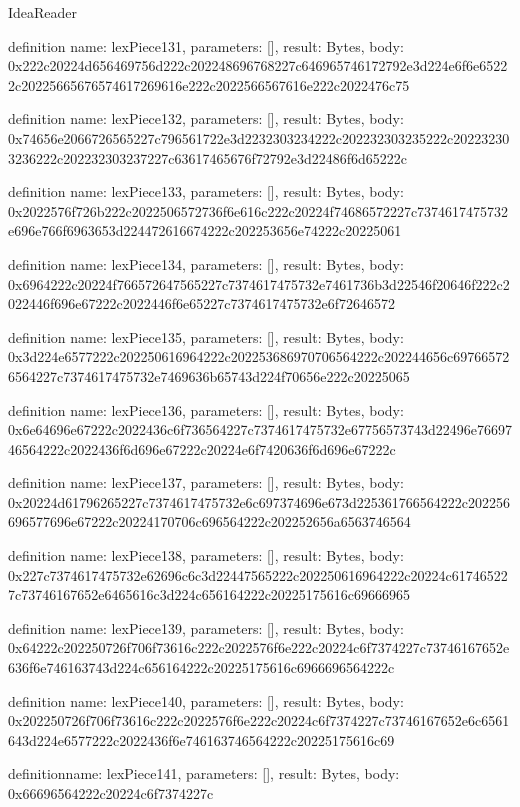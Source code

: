 \begin{lexlean}{IdeaReader}
\begin{semanticmodule}
definition{
  name: lexPiece131,
  parameters: [],
  result: Bytes,
  body: 0x222c20224d656469756d222c202248696768227c646965746172792e3d224e6f6e65222c20225665676574617269616e222c2022566567616e222c2022476c75
}

definition{
  name: lexPiece132,
  parameters: [],
  result: Bytes,
  body: 0x74656e2066726565227c796561722e3d2232303234222c202232303235222c202232303236222c202232303237227c63617465676f72792e3d22486f6d65222c
}

definition{
  name: lexPiece133,
  parameters: [],
  result: Bytes,
  body: 0x2022576f726b222c2022506572736f6e616c222c20224f74686572227c7374617475732e696e766f6963653d224472616674222c202253656e74222c20225061
}

definition{
  name: lexPiece134,
  parameters: [],
  result: Bytes,
  body: 0x6964222c20224f766572647565227c7374617475732e7461736b3d22546f20646f222c2022446f696e67222c2022446f6e65227c7374617475732e6f72646572
}

definition{
  name: lexPiece135,
  parameters: [],
  result: Bytes,
  body: 0x3d224e6577222c202250616964222c202253686970706564222c202244656c697665726564227c7374617475732e7469636b65743d224f70656e222c20225065
}

definition{
  name: lexPiece136,
  parameters: [],
  result: Bytes,
  body: 0x6e64696e67222c2022436c6f736564227c7374617475732e67756573743d22496e7669746564222c2022436f6d696e67222c20224e6f7420636f6d696e67222c
}

definition{
  name: lexPiece137,
  parameters: [],
  result: Bytes,
  body: 0x20224d61796265227c7374617475732e6c697374696e673d225361766564222c202256696577696e67222c20224170706c696564222c202252656a6563746564
}

definition{
  name: lexPiece138,
  parameters: [],
  result: Bytes,
  body: 0x227c7374617475732e62696c6c3d22447565222c202250616964222c20224c617465227c73746167652e6465616c3d224c656164222c20225175616c69666965
}

definition{
  name: lexPiece139,
  parameters: [],
  result: Bytes,
  body: 0x64222c202250726f706f73616c222c2022576f6e222c20224c6f7374227c73746167652e636f6e746163743d224c656164222c20225175616c6966696564222c
}

definition{
  name: lexPiece140,
  parameters: [],
  result: Bytes,
  body: 0x202250726f706f73616c222c2022576f6e222c20224c6f7374227c73746167652e6c6561643d224e6577222c2022436f6e746163746564222c20225175616c69
}

definition{name: lexPiece141, parameters: [], result: Bytes, body: 0x66696564222c20224c6f7374227c}


\end{semanticmodule}
\end{lexlean}
